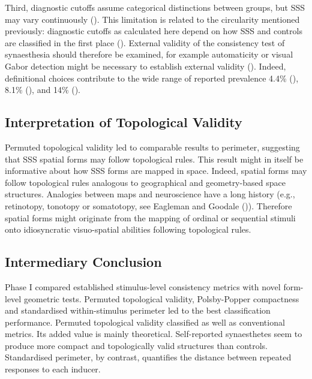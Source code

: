 \documentclass[
  man,
  floatsintext,
  longtable,
  nolmodern,
  notxfonts,
  notimes,
  colorlinks=true,linkcolor=blue,citecolor=blue,urlcolor=blue]{apa7}
\begin{document}
Third, diagnostic cutoffs assume categorical distinctions between
groups, but SSS may vary continuously (). This limitation is related to the circularity mentioned
previously: diagnostic cutoffs as calculated here depend on how SSS and
controls are classified in the first place
(). External validity of the
consistency test of synaesthesia should therefore be examined, for
example automaticity or visual Gabor detection might be necessary to
establish external validity (). Indeed, definitional choices contribute to the wide range of
reported prevalence 4.4\% (), 8.1\% (), and 14\%
().

\subsection{Interpretation of Topological
Validity}\label{interpretation-of-topological-validity}

Permuted topological validity led to comparable results to perimeter,
suggesting that SSS spatial forms may follow topological rules. This
result might in itself be informative about how SSS forms are mapped in
space. Indeed, spatial forms may follow topological rules analogous to
geographical and geometry-based space structures. Analogies between maps
and neuroscience have a long history (e.g., retinotopy, tonotopy or
somatotopy, see Eagleman and Goodale
()). Therefore spatial forms might
originate from the mapping of ordinal or sequential stimuli onto
idiosyncratic visuo-spatial abilities following topological rules.

\subsection{Intermediary Conclusion}\label{sec-conclusions}

Phase I compared established stimulus-level consistency metrics with
novel form-level geometric tests. Permuted topological validity,
Polsby-Popper compactness and standardised within-stimulus perimeter led
to the best classification performance. Permuted topological validity
classified as well as conventional metrics. Its added value is mainly
theoretical. Self-reported synaesthetes seem to produce more compact and
topologically valid structures than controls. Standardised perimeter, by
contrast, quantifies the distance between repeated responses to each
inducer.
\end{document}
